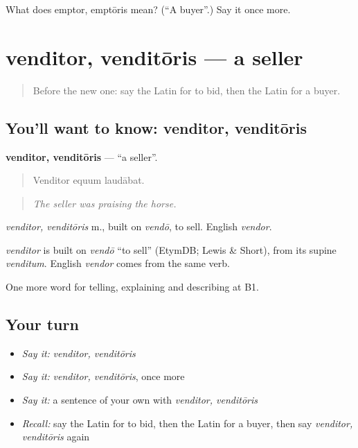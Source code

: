 \begin{tcolorbox}[breakable,colback=teal!4,colframe=teal!35!black,title={Before you move on}]
What does emptor, emptōris mean? (\textquotedblleft{}A buyer\textquotedblright{}.) Say it once more.
\end{tcolorbox}
\section[venditor, venditōris]{venditor, venditōris — a seller}

\label{lesson:LA-C420-venditor}



\begin{quote}
Before the new one: say the Latin for to bid, then the Latin for a buyer.
\end{quote}

\subsection*{You'll want to know: venditor, venditōris}
\textbf{venditor, venditōris} — \textquotedblleft{}a seller\textquotedblright{}.

\begin{quote}
Venditor equum laudābat.
\end{quote}

\begin{quote}
\emph{The seller was praising the horse.}
\end{quote}

\emph{venditor, venditōris} m., built on \emph{vendō}, to sell. English \emph{vendor}.

\begin{cousinweb}
\emph{venditor} is built on \emph{vendō} \textquotedblleft{}to sell\textquotedblright{} (EtymDB; Lewis \& Short), from its supine \emph{venditum}. English \emph{vendor} comes from the same verb.
\end{cousinweb}

\begin{grammarlens}[title={What you've built}]
One more word for telling, explaining and describing at B1.
\end{grammarlens}

\subsection*{Your turn}
\begin{itemize}
\raggedright
  \item \emph{Say it:} \emph{venditor, venditōris}
  \item \emph{Say it:} \emph{venditor, venditōris}, once more
  \item \emph{Say it:} a sentence of your own with \emph{venditor, venditōris}
  \item \emph{Recall:} say the Latin for to bid, then the Latin for a buyer, then say \emph{venditor, venditōris} again
\end{itemize}

